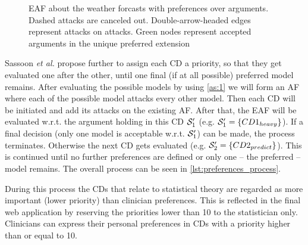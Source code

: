 \begin{figure}[b!]
\centering
{}
\caption{\gls{EAF} about the weather forcasts with preferences over arguments. Dashed attacks are canceled out. Double-arrow-headed edges represent attacks on attacks. Green nodes represent accepted arguments in the unique preferred extension}
\label{fig:eaf_intro}
\end{figure}


Sassoon \textit{et al.} propose further to assign each \gls{CD} a priority, so that they get evaluated one after the other, until one final (if at all possible) preferred model remains. After evaluating the possible models by using \autoref{as:1} we will form an \gls{AF} where each of the possible model attacks every other model. Then each \gls{CD} will be initiated and add its attacks on the existing \gls{AF}. After that, the \gls{EAF} will be evaluated w.r.t. the argument holding in this \gls{CD} $\S_1'$ (e.g. $\S_1' = \{CD1_{heavy}\}$). If a final decision (only one model is acceptable w.r.t. $\S_1'$) can be made, the process terminates. Otherwise the next \gls{CD} gets evaluated (e.g. $\S_2' = \{CD2_{predict}\}$). This is continued until no further preferences are defined or only one -- the preferred -- model remains. The overall process can be seen in \autoref{lst:preferences_process}.

During this process the \glspl{CD} that relate to statistical theory are regarded as more important (lower priority) than clinician preferences. This is reflected in the final web application by reserving the priorities lower than 10 to the statistician only. Clinicians can express their personal preferences in \glspl{CD} with a priority higher than or equal to 10. 
 
